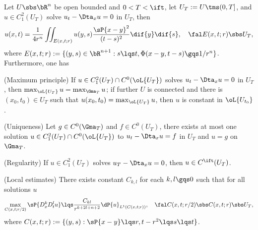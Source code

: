 \documentclass[article, a4paper, twoside]{universal}
\begin{document}
\begin{thm}
    Let $U\sbs\bR^{n}$ be open bounded and $0<T<\ift$, let $U_{T}:=U\tms(0,T]$, and $u\in C_{1}^{2}(U_{T})$ solve $u_{t}-\Dta_{x}u=0$ in $U_{T}$, then
    \[
        u(x,t)=\frac{1}{4r^{n}}\iint_{E(x,t;r)}u(y,s)\frac{\sP{x-y}^{2}}{(t-s)^{2}}\dif{y}\dif{s},\quad \fal E(x,t;r)\sbs U_{T},
    \]
    where $E(x,t;r):=\{(y,s)\in\bR^{n+1}:s\lqs t, \Phi(x-y,t-s)\gqs1/r^{n}\}$. Furthermore, one has
    \begin{itm}
        \item (Maximum principle) If $u\in C_{1}^{2}(U_{T})\cap C^{0}(\oL{U_{T}})$ solves $u_{t}-\Dta_{x}u=0$ in $U_{T}$, then $\max_{\oL{U_{T}}}u=\max_{\Gma_{T}}u$; if further $U$ is connected and there is $(x_{0},t_{0})\in U_{T}$ such that $u(x_{0},t_{0})=\max_{\oL{U_{T}}}u$, then $u$ is constant in $\oL{U_{t_{0}}}$.
        \item (Uniqueness) Let $g\in C^{0}(\Gma_{T})$ and $f\in C^{0}(U_{T})$, there exists at most one solution $u\in C_{1}^{2}(U_{T})\cap C^{0}(\oL{U_{T}})$ to $u_{t}-\Dta_{x}u=f$ in $U_{T}$ and $u=g$ on $\Gma_{T}$.
        \item (Regularity) If $u\in C_{1}^{2}(U_{T})$ solves $u_{T}-\Dta_{x}u=0$, then $u\in C^{\ift}(U_{T})$.
        \item (Local estimates) There exists constant $C_{k,l}$ for each $k,l\gqs0$ such that for all solutions $u$
        \[
            \max_{C(x,t;r/2)}\sP{D_{x}^{k}D_{t}^{l}u}\lqs\frac{C_{kl}}{r^{k+2l+n+2}}\dP{u}_{L^{1}(C(x,t;r))},\quad \fal C(x,t;r/2)\sbs C(x,t;r)\sbs U_{T},
        \]
        where $C(x,t;r):=\{(y,s):\sP{x-y}\lqs r, t-r^{2}\lqs s\lqs t\}$.
    \end{itm}
\end{thm}


\end{document}

